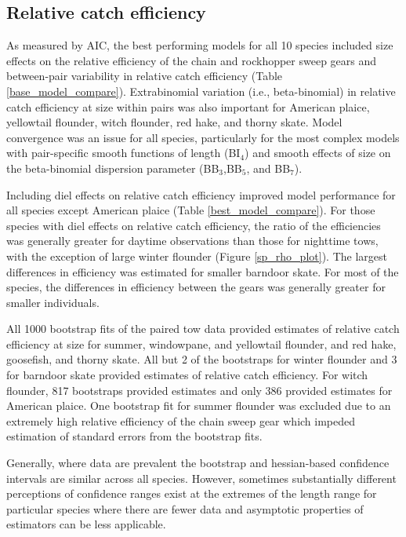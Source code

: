 \documentclass[
  12pt,
]{article}
\begin{document}
\hypertarget{relative-catch-efficiency}{%
\subsection{Relative catch efficiency}\label{relative-catch-efficiency}}

As measured by AIC, the best performing models for all 10 species
included size effects on the relative efficiency of the chain and
rockhopper sweep gears and between-pair variability in relative catch
efficiency (Table \ref{base_model_compare}). Extrabinomial variation
(i.e., beta-binomial) in relative catch efficiency at size within pairs
was also important for American plaice, yellowtail flounder, witch
flounder, red hake, and thorny skate. Model convergence was an issue for
all species, particularly for the most complex models with pair-specific
smooth functions of length (BI\(_4\)) and smooth effects of size on the
beta-binomial dispersion parameter (BB\(_3\),BB\(_5\), and BB\(_7\)).

Including diel effects on relative catch efficiency improved model
performance for all species except American plaice (Table
\ref{best_model_compare}). For those species with diel effects on
relative catch efficiency, the ratio of the efficiencies was generally
greater for daytime observations than those for nighttime tows, with the
exception of large winter flounder (Figure \ref{sp_rho_plot}). The
largest differences in efficiency was estimated for smaller barndoor
skate. For most of the species, the differences in efficiency between
the gears was generally greater for smaller individuals.

All 1000 bootstrap fits of the paired tow data provided estimates of
relative catch efficiency at size for summer, windowpane, and yellowtail
flounder, and red hake, goosefish, and thorny skate. All but 2 of the
bootstraps for winter flounder and 3 for barndoor skate provided
estimates of relative catch efficiency. For witch flounder, 817
bootstraps provided estimates and only 386 provided estimates for
American plaice. One bootstrap fit for summer flounder was excluded due
to an extremely high relative efficiency of the chain sweep gear which
impeded estimation of standard errors from the bootstrap fits.

Generally, where data are prevalent the bootstrap and hessian-based
confidence intervals are similar across all species. However, sometimes
substantially different perceptions of confidence ranges exist at the
extremes of the length range for particular species where there are
fewer data and asymptotic properties of estimators can be less
applicable.
\end{document}
